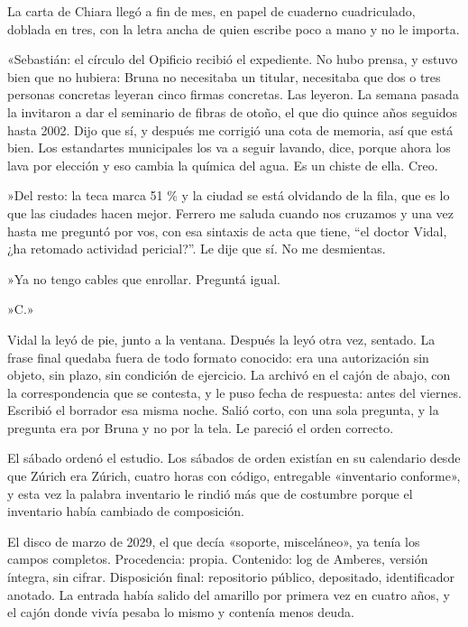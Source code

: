 La carta de Chiara llegó a fin de mes, en papel de cuaderno cuadriculado, doblada en tres, con la letra ancha de quien escribe poco a mano y no le importa.

«Sebastián: el círculo del Opificio recibió el expediente. No hubo prensa, y estuvo bien que no hubiera: Bruna no necesitaba un titular, necesitaba que dos o tres personas concretas leyeran cinco firmas concretas. Las leyeron. La semana pasada la invitaron a dar el seminario de fibras de otoño, el que dio quince años seguidos hasta 2002. Dijo que sí, y después me corrigió una cota de memoria, así que está bien. Los estandartes municipales los va a seguir lavando, dice, porque ahora los lava por elección y eso cambia la química del agua. Es un chiste de ella. Creo.

»Del resto: la teca marca 51 \% y la ciudad se está olvidando de la fila, que es lo que las ciudades hacen mejor. Ferrero me saluda cuando nos cruzamos y una vez hasta me preguntó por vos, con esa sintaxis de acta que tiene, ``el doctor Vidal, ¿ha retomado actividad pericial?''. Le dije que sí. No me desmientas.

»Ya no tengo cables que enrollar. Preguntá igual.

»C.»

Vidal la leyó de pie, junto a la ventana. Después la leyó otra vez, sentado. La frase final quedaba fuera de todo formato conocido: era una autorización sin objeto, sin plazo, sin condición de ejercicio. La archivó en el cajón de abajo, con la correspondencia que se contesta, y le puso fecha de respuesta: antes del viernes. Escribió el borrador esa misma noche. Salió corto, con una sola pregunta, y la pregunta era por Bruna y no por la tela. Le pareció el orden correcto.


\scenebreak


El sábado ordenó el estudio. Los sábados de orden existían en su calendario desde que Zúrich era Zúrich, cuatro horas con código, entregable «inventario conforme», y esta vez la palabra inventario le rindió más que de costumbre porque el inventario había cambiado de composición.

El disco de marzo de 2029, el que decía «soporte, misceláneo», ya tenía los campos completos. Procedencia: propia. Contenido: log de Amberes, versión íntegra, sin cifrar. Disposición final: repositorio público, depositado, identificador anotado. La entrada había salido del amarillo por primera vez en cuatro años, y el cajón donde vivía pesaba lo mismo y contenía menos deuda.

